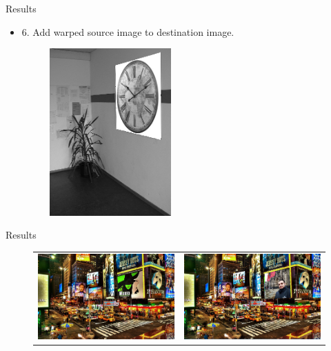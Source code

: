 \documentclass[xcolor={x11names,svgnames,dvipsnames},trans]{beamer}
\begin{document}
\begin{frame}{Results}
    \begin{itemize}
        \item 6. Add warped source image to destination image.
        \begin{figure}
                \includegraphics[width=4.666cm]{images/task5-result.PNG}
            \end{figure}
    \end{itemize}
\end{frame}

\begin{frame}{Results}
 \begin{figure}
             \begin{tabular}{cc}
                {\includegraphics[width=5.666cm]{images/times-square.jpg}} 
              & {\includegraphics[width=5.666cm]{images/task5-extra-2.PNG}}
            \end{tabular}
             \end{figure}
\end{frame}
\end{document}

